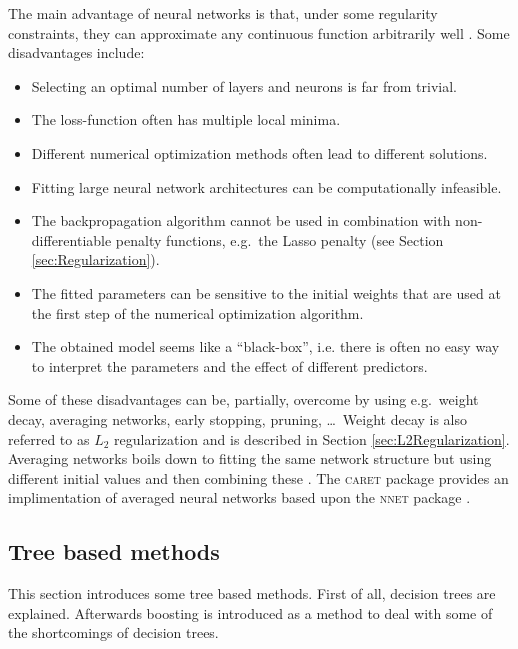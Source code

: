 The main advantage of neural networks is that, under some regularity constraints, they can approximate any continuous function arbitrarily well \parencite{hornik_multilayer_1989}. Some disadvantages include:
\begin{itemize}
\item Selecting an optimal number of layers and neurons is far from trivial.
\item The loss-function often has multiple local minima.
\item Different numerical optimization methods often lead to different solutions.
\item Fitting large neural network architectures can be computationally infeasible.
\item The backpropagation algorithm cannot be used in combination with non-differentiable penalty functions, e.g.\ the Lasso penalty (see Section \ref{sec:Regularization}).
\item The fitted parameters can be sensitive to the initial weights that are used at the first step of the numerical optimization algorithm.
\item The obtained model seems like a ``black-box'', i.e. there is often no easy way to interpret the parameters and the effect of different predictors.
\end{itemize}
Some of these disadvantages can be, partially, overcome by using e.g.\ weight decay, averaging networks, early stopping, pruning, \dots\ Weight decay is also referred to as $L_2$ regularization and is described in Section \ref{sec:L2Regularization}. Averaging networks boils down to fitting the same network structure but using different initial values and then combining these \parencite{ripley_pattern_2009}. The \textsc{caret} package \parencite{caret} provides an implimentation of averaged neural networks based upon the \textsc{nnet} package \parencite{nnet}.


\subsection{Tree based methods}
This section introduces some tree based methods. First of all, decision trees are explained. Afterwards boosting is introduced as a method to deal with some of the shortcomings of decision trees.

